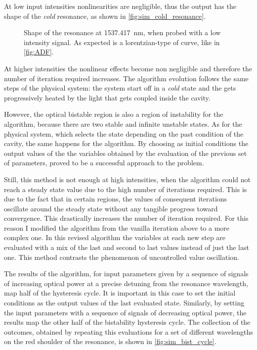 At low input intensities nonlinearities are negligible, thus the output has the shape of the \textit{cold} resonance, as shown in \autoref{fig:sim_cold_resonance}.

\begin{figure}[htbp]
	\centering
	
	\caption{
		Shape of the resonance at \SI{1537.417}{\nm}, when probed with a low intensity signal.
		As expected is a lorentzian-type of curve, like in \autoref{fig:ADF}.
	}
	\label{fig:sim_cold_resonance}
\end{figure}

At higher intensities the nonlinear effects become non negligible and therefore the number of iteration required increases.
The algorithm evolution follows the same steps of the physical system: the system start off in a \textit{cold} state and the gets progressively heated by the light that gets coupled inside the cavity.

However, the optical bistable region is also a region of instability for the algorithm, because there are two stable and infinite unstable states.
As for the physical system, which selects the state depending on the past condition of the cavity, the same happens for the algorithm.
By choosing as initial conditions the output values of the the variables obtained by the evaluation of the previous set of parameters, proved to be a successful approach to the problem.

Still, this method is not enough at high intensities, when the algorithm could not reach a steady state value due to the high number of iterations required.
This is due to the fact that in certain regions, the values of consequent iterations oscillate around the steady state without any tangible progress toward convergence.
This drastically increases the number of iteration required.
For this reason I modified the algorithm from the vanilla iteration above to a more complex one.
In this revised algorithm the variables at each new step are evaluated with a mix of the last and second to last values instead of just the last one.
This method contrasts the phenomenon of uncontrolled value oscillation.

The results of the algorithm, for input parameters given by a sequence of signals of increasing optical power at a precise detuning from the resonance wavelength, map half of the hysteresis cycle.
It is important in this case to set the initial conditions as the output values of the last evaluated state.
Similarly, by setting the input parameters with a sequence of signals of decreasing optical power, the results map the other half of the bistability hysteresis cycle.
The collection of the outcomes, obtained by repeating this evaluations for a set of different wavelengths on the red shoulder of the resonance, is shown in \autoref{fig:sim_bist_cycle}.

